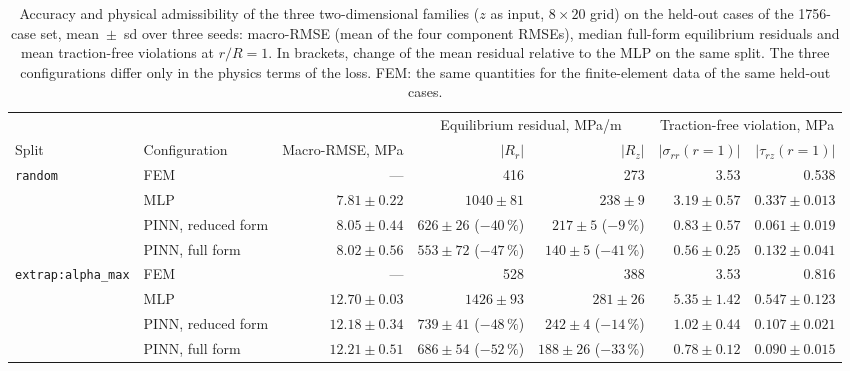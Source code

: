 \begin{table}[t]
\caption[Accuracy and physical admissibility of the two-dimensional families]{Accuracy and physical admissibility of the three two-dimensional families ($z$ as input, $8\times20$ grid) on the held-out cases of the 1756-case set, mean~$\pm$~sd over three seeds: macro-RMSE (mean of the four component RMSEs), median full-form equilibrium residuals and mean traction-free violations at $r/R=1$. In brackets, change of the mean residual relative to the MLP on the same split. The three configurations differ only in the physics terms of the loss. FEM: the same quantities for the finite-element data of the same held-out cases.}
\label{tab:admissibility}
\centering\small
\setlength{\tabcolsep}{4pt}
\begin{tabular}{@{}llrrrrr@{}}
\toprule
 & & & \multicolumn{2}{c}{Equilibrium residual, MPa/m} & \multicolumn{2}{c}{Traction-free violation, MPa} \\
\cmidrule(lr){4-5}\cmidrule(lr){6-7}
Split & Configuration & Macro-RMSE, MPa & $|R_r|$ & $|R_z|$ & $|\sigma_{rr}(r{=}1)|$ & $|\tau_{rz}(r{=}1)|$ \\
\midrule
\texttt{random} & FEM                & ---           & 416 & 273 & 3.53 & 0.538 \\
                & MLP                & $7.81\pm0.22$ & $1040\pm81$ & $238\pm9$ & $3.19\pm0.57$ & $0.337\pm0.013$ \\
                & PINN, reduced form & $8.05\pm0.44$ & $626\pm26$ ($-40\,\%$) & $217\pm5$ ($-9\,\%$) & $0.83\pm0.57$ & $0.061\pm0.019$ \\
                & PINN, full form    & $8.02\pm0.56$ & $553\pm72$ ($-47\,\%$) & $140\pm5$ ($-41\,\%$) & $0.56\pm0.25$ & $0.132\pm0.041$ \\
\addlinespace
\texttt{extrap:alpha\_max} & FEM                & ---            & 528 & 388 & 3.53 & 0.816 \\
                           & MLP                & $12.70\pm0.03$ & $1426\pm93$ & $281\pm26$ & $5.35\pm1.42$ & $0.547\pm0.123$ \\
                           & PINN, reduced form & $12.18\pm0.34$ & $739\pm41$ ($-48\,\%$) & $242\pm4$ ($-14\,\%$) & $1.02\pm0.44$ & $0.107\pm0.021$ \\
                           & PINN, full form    & $12.21\pm0.51$ & $686\pm54$ ($-52\,\%$) & $188\pm26$ ($-33\,\%$) & $0.78\pm0.12$ & $0.090\pm0.015$ \\
\bottomrule
\end{tabular}
\end{table}
